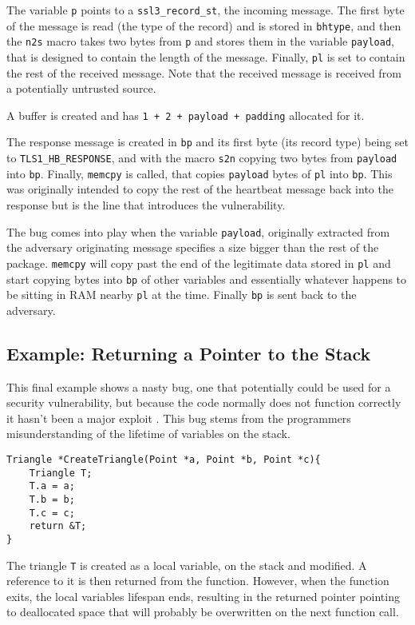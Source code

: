 The variable \verb!p! points to a \verb!ssl3_record_st!, the incoming message.
The first byte of the message is read (the type of the record) and is stored in \verb!bhtype!, and then the \verb!n2s! macro takes two bytes from \verb!p! and stores them in the variable \verb!payload!, that is designed to contain the length of the message.
Finally, \verb!pl! is set to contain the rest of the received message.
Note that the received message is received from a potentially untrusted source.

A buffer is created and has \verb!1 + 2 + payload + padding! allocated for it.

The response message is created in \verb!bp! and its first byte (its record type) being set to \verb!TLS1_HB_RESPONSE!, and with the macro \verb!s2n! copying two bytes from \verb!payload! into \verb!bp!.
Finally, \verb!memcpy! is called, that copies \verb!payload! bytes of \verb!pl! into \verb!bp!.
This was originally intended to copy the rest of the heartbeat message back into the response but is the line that introduces the vulnerability.

The bug comes into play when the variable \verb!payload!, originally extracted from the adversary originating message specifies a size bigger than the rest of the package.
\verb!memcpy! will copy past the end of the legitimate data stored in \verb!pl! and start copying bytes into \verb!bp! of other variables and essentially whatever happens to be sitting in RAM nearby \verb!pl! at the time.
Finally \verb!bp! is sent back to the adversary.


\subsection{Example: Returning a Pointer to the Stack}
This final example shows a nasty bug, one that potentially could be used for a security vulnerability, but because the code normally does not function correctly it hasn't been a major exploit \cite{returnLocal}.
This bug stems from the programmers misunderstanding of the lifetime of variables on the stack.

\begin{verbatim}
Triangle *CreateTriangle(Point *a, Point *b, Point *c){
    Triangle T;
    T.a = a;
	T.b = b;
    T.c = c;
    return &T;
}
\end{verbatim}

The triangle \verb!T! is created as a local variable, on the stack and modified.
A reference to it is then returned from the function.
However, when the function exits, the local variables lifespan ends, resulting in the returned pointer pointing to deallocated space that will probably be overwritten on the next function call.

